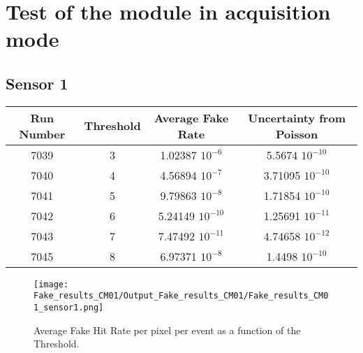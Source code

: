 \documentclass[a4papper, 11pt]{article}
\begin{document}
    \newpage
    \section{Test of the module in acquisition mode}

        \subsection{Sensor 1}

            \begin{center}
                \begin{tabular}{|c|c|c|c|}
                  \hline %
\rowcolor{light-gray}  Run Number  &   Threshold   &   Average Fake Rate    &   Uncertainty from Poisson         \tabularnewline
                  \hline %
                      7039      &       3       &   1.02387 $10^{-6}$ &  5.5674  $10^{-10}$ \tabularnewline   
                  \hline %
                      7040      &       4       &   4.56894 $10^{-7}$ &  3.71095 $10^{-10}$ \tabularnewline
                  \hline %
                      7041      &       5       &   9.79863 $10^{-8}$ &  1.71854 $10^{-10}$ \tabularnewline
                  \hline %
                      7042      &       6       &   5.24149 $10^{-10}$ &  1.25691 $10^{-11}$ \tabularnewline
                  \hline %
                      7043      &       7       &   7.47492 $10^{-11}$ &  4.74658 $10^{-12}$ \tabularnewline                 
                  \hline %
                      7045      &       8       &   6.97371 $10^{-8}$ &  1.4498 $10^{-10}$ \tabularnewline 
                  \hline %
                \end{tabular}
            \end{center}

        \begin{figure}[!h]
            \centering
            \texttt{[image: Fake\_results\_CM01/Output\_Fake\_results\_CM01/Fake\_results\_CM01\_sensor1.png]}
            \caption{Average Fake Hit Rate per pixel per event as a function of the Threshold.}
        \end{figure}
    \FloatBarrier 
            
\end{document}
